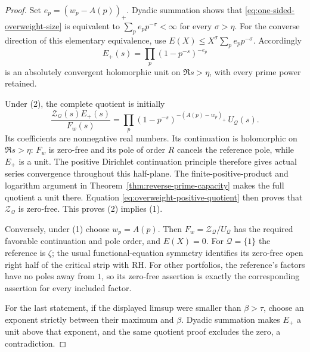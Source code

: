 \documentclass[11pt]{article}
\theoremstyle{definition}
\begin{document}
\begin{proof}
Set $e_p=(w_p-A(p))_+$.
Dyadic summation shows that
\eqref{eq:one-sided-overweight-size} is equivalent to
$\sum_p e_p p^{-\sigma}<\infty$ for every $\sigma>\eta$.
For the converse direction of this elementary equivalence,
use $E(X)\le X^\sigma\sum_p e_p p^{-\sigma}$.
Accordingly
\[
                  E_+(s)=\prod_p(1-p^{-s})^{-e_p}
\]
is an absolutely convergent holomorphic unit on $\Re s>\eta$,
with every prime power retained.

Under (2), the complete quotient is initially
\begin{equation}
 \frac{\mathcal Z_{\mathcal Q}(s)E_+(s)}{F_w(s)}
   =\prod_p(1-p^{-s})^{-(A(p)-w_p)_+}\,U_{\mathcal Q}(s).
 \label{eq:overweight-positive-quotient}
\end{equation}
Its coefficients are nonnegative real numbers.
Its continuation is holomorphic on $\Re s>\eta$:
$F_w$ is zero-free and its pole of order $R$ cancels the
reference pole, while $E_+$ is a unit.
The positive Dirichlet continuation principle therefore
gives actual series convergence throughout this half-plane.
The finite-positive-product and logarithm argument in
Theorem~\ref{thm:reverse-prime-capacity} makes the full
quotient a unit there. Equation
\eqref{eq:overweight-positive-quotient} then proves that
$\mathcal Z_{\mathcal Q}$ is zero-free. This proves (2)
implies (1).

Conversely, under (1) choose $w_p=A(p)$.
Then $F_w=\mathcal Z_{\mathcal Q}/U_{\mathcal Q}$ has the
required favorable continuation and pole order, and $E(X)=0$.
For $\mathcal Q=\{1\}$ the reference is $\zeta$; the usual
functional-equation symmetry identifies its zero-free
open right half of the critical strip with RH.
For other portfolios, the reference's factors have no poles
away from $1$, so its zero-free assertion is exactly the
corresponding assertion for every included factor.

For the last statement, if the displayed limsup were smaller
than $\beta>\tau$, choose an exponent strictly between their
maximum and $\beta$. Dyadic summation makes $E_+$ a unit
above that exponent, and the same quotient proof excludes
the zero, a contradiction.
\end{proof}
\end{document}
